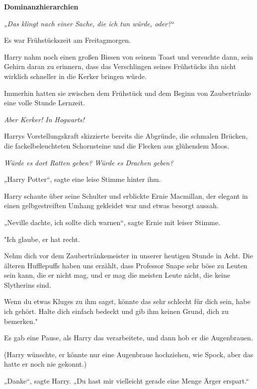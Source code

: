 

\hypertarget{dominanzhierarchien}{%

\textbf{Dominanzhierarchien}

„\emph{Das klingt nach einer Sache, die ich tun würde, oder?}“

Es war Frühstückszeit am Freitagmorgen.

Harry nahm noch einen großen Bissen von seinem Toast und versuchte dann, sein Gehirn daran zu erinnern, dass das Verschlingen seines Frühstücks ihn nicht wirklich schneller in die Kerker bringen würde.

Immerhin hatten sie zwischen dem Frühstück und dem Beginn von Zaubertränke eine volle Stunde Lernzeit.

\emph{Aber Kerker! In Hogwarts!}

Harrys Vorstellungskraft skizzierte bereits die Abgründe, die schmalen Brücken, die fackelbeleuchteten Schornsteine und die Flecken aus glühendem Moos.

\emph{Würde es dort Ratten geben? Würde es Drachen geben?}

„Harry Potter“, sagte eine leise Stimme hinter ihm.

Harry schaute über seine Schulter und erblickte Ernie Macmillan, der elegant in einen gelbgestreiften Umhang gekleidet war und etwas besorgt aussah.

„Neville dachte, ich sollte dich warnen“, sagte Ernie mit leiser Stimme.

"Ich glaube, er hat recht.

Nehm dich vor dem Zaubertränkemeister in unserer heutigen Stunde in Acht. Die älteren Hufflepuffs haben uns erzählt, dass Professor Snape sehr böse zu Leuten sein kann, die er nicht mag, und er mag die meisten Leute nicht, die keine Slytherins sind.

Wenn du etwas Kluges zu ihm sagst, könnte das sehr schlecht für dich sein, habe ich gehört. Halte dich einfach bedeckt und gib ihm keinen Grund, dich zu bemerken."

Es gab eine Pause, als Harry das verarbeitete, und dann hob er die Augenbrauen.

(Harry wünschte, er könnte nur eine Augenbraue hochziehen, wie Spock, aber das hatte er noch nie gekonnt.)

„Danke“, sagte Harry. „Du hast mir vielleicht gerade eine Menge Ärger erspart.“

}
